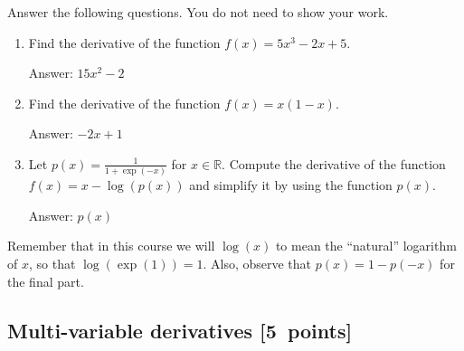 \documentclass{article}
\newcommand{\blu}[1]{{\textcolor{blu}{#1}}}
\newenvironment{answer}{\par\begingroup\color{gre}Answer: }{\endgroup}
\let\ask\blu
\newcommand\pts[1]{\textcolor{pointscolour}{[#1~points]}}
\def\R{\mathbb{R}}
\begin{document}
  \ask{Answer the following questions.} You do not need to show your work.

  \begin{enumerate}
  \item Find the derivative of the function $f(x) = 5x^3 -2x + 5$.
  \begin{answer}
  $
  15x^2-2
  $
  \end{answer}
  \item Find the derivative of the function $f(x) = x(1-x)$.
  \begin{answer}
  $
  -2x+1
  $
  \end{answer}
  \item Let $p(x) = \frac{1}{1+\exp(-x)}$ for $x \in \R$. Compute the derivative of the function $f(x) = x-\log(p(x))$ and simplify it by using the function $p(x)$.
  \begin{answer}
  $
  p(x)
  $
  \end{answer}
  \end{enumerate}
  Remember that in this course we will $\log(x)$ to mean the ``natural'' logarithm of $x$, so that $\log(\exp(1)) = 1$. Also, observe that $p(x) = 1-p(-x)$ for the final part.

  \subsection{Multi-variable derivatives \pts{5}}
  \label{sub.multi.var}
\end{document}
